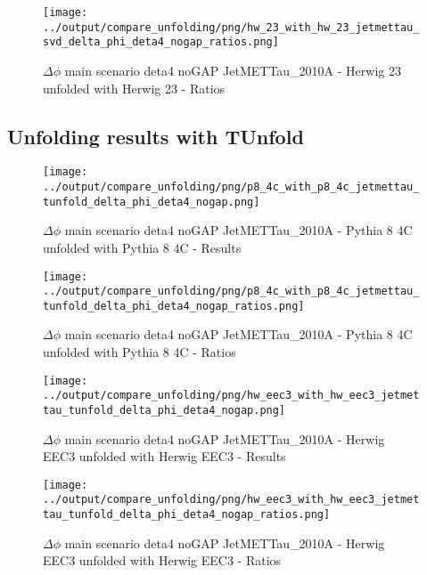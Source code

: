 \documentclass[11pt]{book}
\begin{document}
\begin{figure}[ht]
\centering
\texttt{[image: ../output/compare\_unfolding/png/hw\_23\_with\_hw\_23\_jetmettau\_svd\_delta\_phi\_deta4\_nogap\_ratios.png]}
\caption{$\Delta\phi$ main scenario deta4 noGAP JetMETTau\_2010A - Herwig 23 unfolded with Herwig 23 - Ratios}
\label{hw_23_hw_23_jetmettau_svd_delta_phi_deta4_nogap_b}
\end{figure}


\clearpage
\subsection{Unfolding results with TUnfold}

\begin{figure}[ht]
\centering
\texttt{[image: ../output/compare\_unfolding/png/p8\_4c\_with\_p8\_4c\_jetmettau\_tunfold\_delta\_phi\_deta4\_nogap.png]}
\caption{$\Delta\phi$ main scenario deta4 noGAP JetMETTau\_2010A - Pythia 8 4C unfolded with Pythia 8 4C - Results}
\label{p8_p8_jetmettau_tunfold_delta_phi_deta4_nogap_a}
\end{figure}

\begin{figure}[ht]
\centering
\texttt{[image: ../output/compare\_unfolding/png/p8\_4c\_with\_p8\_4c\_jetmettau\_tunfold\_delta\_phi\_deta4\_nogap\_ratios.png]}
\caption{$\Delta\phi$ main scenario deta4 noGAP JetMETTau\_2010A - Pythia 8 4C unfolded with Pythia 8 4C - Ratios}
\label{p8_p8_jetmettau_tunfold_delta_phi_deta4_nogap_b}
\end{figure}

\begin{figure}[ht]
\centering
\texttt{[image: ../output/compare\_unfolding/png/hw\_eec3\_with\_hw\_eec3\_jetmettau\_tunfold\_delta\_phi\_deta4\_nogap.png]}
\caption{$\Delta\phi$ main scenario deta4 noGAP JetMETTau\_2010A - Herwig EEC3 unfolded with Herwig EEC3 - Results}
\label{hw_eec3_hw_eec3_jetmettau_tunfold_delta_phi_deta4_nogap_a}
\end{figure}

\begin{figure}[ht]
\centering
\texttt{[image: ../output/compare\_unfolding/png/hw\_eec3\_with\_hw\_eec3\_jetmettau\_tunfold\_delta\_phi\_deta4\_nogap\_ratios.png]}
\caption{$\Delta\phi$ main scenario deta4 noGAP JetMETTau\_2010A - Herwig EEC3 unfolded with Herwig EEC3 - Ratios}
\label{hw_eec3_hw_eec3_jetmettau_tunfold_delta_phi_deta4_nogap_b}
\end{figure}
\end{document}
